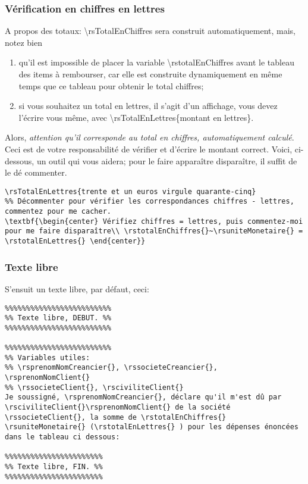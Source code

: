 \documentclass[a4paper,10pt]{article}
\begin{document}
\subsubsection{Vérification en chiffres en lettres}


A propos des totaux: \textbackslash rsTotalEnChiffres sera construit automatiquement, mais, notez bien 
\begin{enumerate}
    \item qu'il est impossible de placer la variable \textbackslash rstotalEnChiffres{} avant le tableau des items à rembourser, car elle est construite dynamiquement en même temps que ce tableau pour obtenir le total chiffres;
    \item si vous souhaitez un total en lettres, il s'agit d'un affichage, vous devez l'écrire vous même, avec \textbackslash rsTotalEnLettres\{montant en lettres\}.
\end{enumerate}

Alors, \emph{attention qu'il corresponde au total en chiffres, automatiquement calculé}. Ceci est de votre responsabilité de vérifier et d'écrire le montant correct. Voici, ci-dessous, un outil qui vous aidera; pour le faire apparaître  disparaître, il suffit de le dé  commenter. 

\begin{lstlisting}
\rsTotalEnLettres{trente et un euros virgule quarante-cinq}
%% Décommenter pour vérifier les correspondances chiffres - lettres, commentez pour me cacher.
\textbf{\begin{center} Vérifiez chiffres = lettres, puis commentez-moi pour me faire disparaître\\ \rstotalEnChiffres{}~\rsuniteMonetaire{} = \rstotalEnLettres{} \end{center}}
\end{lstlisting}


\subsubsection{Texte libre}
S'ensuit un texte libre, par défaut, ceci:

\begin{lstlisting}
%%%%%%%%%%%%%%%%%%%%%%%%%
%% Texte libre, DEBUT. %%
%%%%%%%%%%%%%%%%%%%%%%%%%

%%%%%%%%%%%%%%%%%%%%%%%%%
%% Variables utiles:
%% \rsprenomNomCreancier{}, \rssocieteCreancier{}, \rsprenomNomClient{}
%% \rssocieteClient{}, \rsciviliteClient{}
Je soussigné, \rsprenomNomCreancier{}, déclare qu'il m'est dû par \rsciviliteClient{}\rsprenomNomClient{} de la société \rssocieteClient{}, la somme de \rstotalEnChiffres{} \rsuniteMonetaire{} (\rstotalEnLettres{} ) pour les dépenses énoncées dans le tableau ci dessous:

%%%%%%%%%%%%%%%%%%%%%%%
%% Texte libre, FIN. %%
%%%%%%%%%%%%%%%%%%%%%%%
\end{lstlisting}
\end{document}
